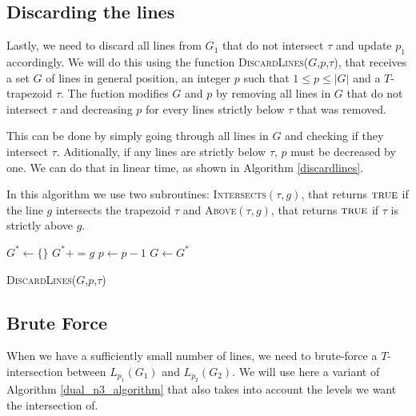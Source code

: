 \documentclass{article}
\begin{document}
\newpage
\subsection{Discarding the lines}

Lastly, we need to discard all lines from $G_1$ that do not intersect $\tau$ and update $p_1$ accordingly. We will do this using the function \textsc{DiscardLines}($G$,$p$,$\tau$), that receives a set $G$ of lines in general position, an integer $p$ such that $1\leq p \leq |G|$ and a $T$-trapezoid $\tau$. The fuction modifies $G$ and $p$ by removing all lines in $G$ that do not intersect $\tau$ and decreasing $p$ for every lines strictly below $\tau$ that was removed.

This can be done by simply going through all lines in $G$ and checking if they intersect $\tau$. Aditionally, if any lines are strictly below $\tau$, $p$ must be decreased by one. We can do that in linear time, as shown in Algorithm \ref{discardlines}.

In this algorithm we use two subroutines: \textsc{Intersects}$(\tau,g)$, that returns $\textsc{true}$ if the line $g$ intersects the trapezoid $\tau$ and \textsc{Above}$(\tau,g)$, that returns $\textsc{true}$ if $\tau$ is strictly above $g$.

\begin{algorithm}
\begin{algorithmic}[1]
\State $G^* \gets \{\}$
 $G^* += g$ \EndIf
{} $p \gets p - 1$ \EndIf
\EndFor
\State $G \gets G^*$
\end{algorithmic}
\caption{\textsc{DiscardLines}($G$,$p$,$\tau$)}
\label{discardlines}
\end{algorithm}

\newpage
\subsection{Brute Force}

When we have a sufficiently small number of lines, we need to brute-force a $T$-intersection between $L_{p_1}(G_1)$ and $L_{p_2}(G_2)$. We will use here a variant of Algorithm \ref{dual_n3_algorithm} that also takes into account the levels we want the intersection of.
\end{document}
